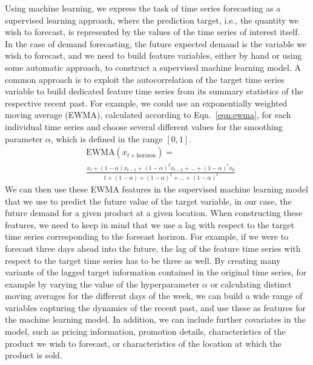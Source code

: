 \documentclass[BCOR=1mm, DIV=calc,10pt,
twoside=true,
twocolumn,
headings=normal]{scrartcl}
\newcommand{\eqn}{Eqn.~}
\begin{document}
Using machine learning, we express the task of time series forecasting as a supervised learning approach, where the prediction target, i.e., the quantity we wish to forecast, is represented by the values of the time series of interest itself. In the case of demand forecasting, the future expected demand is the variable we wish to forecast, and we need to build feature variables, either by hand or using some automatic approach, to construct a supervised machine learning model. A common approach is to exploit the autocorrelation of the target time series variable to build dedicated feature time series from its summary statistics of the respective recent past. For example, we could use an exponentially weighted moving average (EWMA), calculated according to \eqn \eqref{eqn:ewma}, for each individual time series and choose several different values for the smoothing parameter $\alpha$, which is defined in the range $[0, 1]$.
\begin{equation} \label{eqn:ewma}
\begin{split}
&\mathrm{EWMA}(x_{t+\mathrm{horizon}}) = \\ &\frac{x_t + (1 - \alpha) x_{t-1} + (1 - \alpha)^2 x_{t-2} + ... + (1 - \alpha)^t x_0}{1 + (1 - \alpha) + (1 - \alpha)^2 + ... + (1 - \alpha)^t}
\end{split}
\end{equation}
We can then use these EWMA features in the supervised machine learning model that we use to predict the future value of the target variable, in our case, the future demand for a given product at a given location. When constructing these features, we need to keep in mind that we use a lag with respect to the target time series corresponding to the forecast horizon. For example, if we were to forecast three days ahead into the future, the lag of the feature time series with respect to the target time series has to be three as well. By creating many variants of the lagged target information contained in the original time series, for example by varying the value of the hyperparameter $\alpha$ or calculating distinct moving averages for the different days of the week, we can build a wide range of variables capturing the dynamics of the recent past, and use these as features for the machine learning model. In addition, we can include further covariates in the model, such as pricing information, promotion details, characteristics of the product we wish to forecast, or characteristics of the location at which the product is sold.
\end{document}
